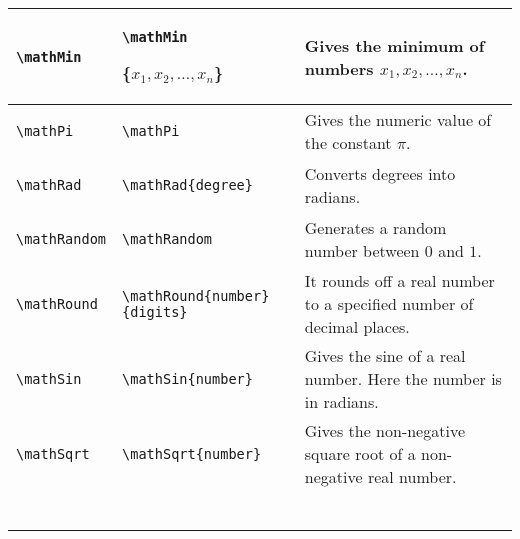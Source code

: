 \documentclass{article}
\begin{document}
\begin{center}
\begin{longtable}{llm{6.5cm}}
\begin{lstlisting}
\mathMin
\end{lstlisting} &
\begin{lstlisting}
\mathMin\end{lstlisting}\{\(x_1,x_2,\ldots,x_n\)\}
 & Gives the minimum of numbers \(x_1,x_2,\ldots,x_n\).\\
\midrule
\begin{lstlisting}
\mathPi
\end{lstlisting} &
\begin{lstlisting}
\mathPi
\end{lstlisting} & Gives the numeric value of the constant \(\pi \). \\
\midrule
\begin{lstlisting}
\mathRad
\end{lstlisting} &
\begin{lstlisting}
\mathRad{degree}
\end{lstlisting} & Converts degrees into radians. \\
\midrule
\begin{lstlisting}
\mathRandom
\end{lstlisting} & \begin{lstlisting}
\mathRandom
\end{lstlisting} & Generates a random number between \(0 \) and \(1 \). \\
\midrule
\begin{lstlisting}
\mathRound
\end{lstlisting} &
\begin{lstlisting}
\mathRound{number}{digits}
\end{lstlisting} & It rounds off a real number to a specified number of decimal places. \\
\midrule
\begin{lstlisting}
\mathSin
\end{lstlisting} &
\begin{lstlisting}
\mathSin{number}
\end{lstlisting} & Gives the sine of a real number. Here the number is in radians.\\
\midrule
\begin{lstlisting}
\mathSqrt
\end{lstlisting} &
\begin{lstlisting}
\mathSqrt{number}
\end{lstlisting} & Gives the non-negative square root of a non-negative real number.\\
\midrule
\begin{lstlisting}

\end{lstlisting}
\end{longtable}
\end{center}
\end{document}
